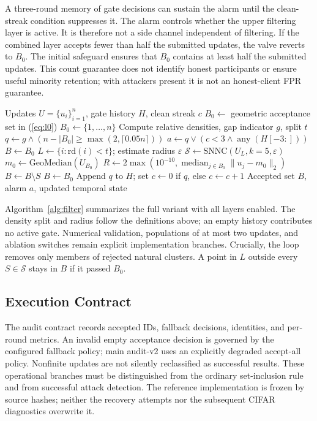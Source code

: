 \documentclass[journal]{IEEEtran}
\newcommand{\rd}{\mathrm{rd}}
\begin{document}
A three-round memory of gate decisions can sustain the alarm until the clean-streak condition suppresses it. The alarm controls whether the upper filtering layer is active. It is therefore not a side channel independent of filtering. If the combined layer accepts fewer than half the submitted updates, the valve reverts to $B_0$. The initial safeguard ensures that $B_0$ contains at least half the submitted updates. This count guarantee does not identify honest participants or ensure useful minority retention; with attackers present it is not an honest-client FPR guarantee.


\begin{algorithm}[!t]
\caption{Full-filter decision for a validated round ($n\geq3$)}\label{alg:filter}
\begin{algorithmic}[1]
\REQUIRE Updates $U=\{u_i\}_{i=1}^n$, gate history $H$, clean streak $c$
\STATE $B_0\gets$ geometric acceptance set in (\ref{eq:l0})
 \STATE $B_0\gets\{1,\ldots,n\}$ \ENDIF
\STATE Compute relative densities, gap indicator $g$, split $t$
\STATE $q\gets g\land(n-|B_0|\geq\max(2,\lceil0.05n\rceil))$
\STATE $a\gets q\lor(c<3\land\operatorname{any}(H[-3:]))$
\STATE $B\gets B_0$
  \STATE $L\gets\{i:\rd(i)<t\}$; estimate radius $\varepsilon$
  \STATE $\mathcal{S}\gets\mathrm{SNNC}(U_L,k=5,\varepsilon)$
  \STATE $m_0\gets\mathrm{GeoMedian}(U_{B_0})$
  \STATE $R\gets2\max(10^{-10},\operatorname{median}_{j\in B_0}\|u_j-m_0\|_2)$
      \STATE $B\gets B\setminus S$
    \ENDIF
  \ENDFOR
   \STATE $B\gets B_0$ \ENDIF
\ENDIF
\STATE Append $q$ to $H$; set $c\gets0$ if $q$, else $c\gets c+1$
\ENSURE Accepted set $B$, alarm $a$, updated temporal state
\end{algorithmic}
\end{algorithm}

Algorithm~\ref{alg:filter} summarizes the full variant with all layers enabled. The density split and radius follow the definitions above; an empty history contributes no active gate. Numerical validation, populations of at most two updates, and ablation switches remain explicit implementation branches. Crucially, the loop removes only members of rejected natural clusters. A point in $L$ outside every $S\in\mathcal{S}$ stays in $B$ if it passed $B_0$.

\subsection{Execution Contract}
The audit contract records accepted IDs, fallback decisions, identities, and per-round metrics. An invalid empty acceptance decision is governed by the configured fallback policy; main audit-v2 uses an explicitly degraded accept-all policy. Nonfinite updates are not silently reclassified as successful results. These operational branches must be distinguished from the ordinary set-inclusion rule and from successful attack detection. The reference implementation is frozen by source hashes; neither the recovery attempts nor the subsequent CIFAR diagnostics overwrite it.
\end{document}
